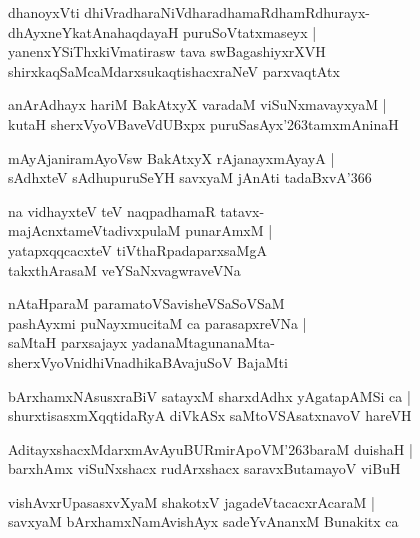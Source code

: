 \documentclass[twoside,12pt,openright]{book}
\def\S{\char'263}
\newcounter{shloka}[chapter]
\begin{document}
\begin{shloka}%
dhanoyxVti dhiVradharaNiVdharadhamaRdhamRdhurayx-\\
dhAyxneYkatAnahaqdayaH puruSoVtatxmaseyx |\\
yanenxYSiThxkiVmatirasw tava swBagashiyxrXVH \\
shirxkaqSaMcaMdarxsukaqtishacxraNeV parxvaqtAtx
\end{shloka}

\begin{shloka}%
anArAdhayx hariM BakAtxyX varadaM viSuNxmavayxyaM |\\
kutaH sherxVyoVBaveVdUBxpx puruSasAyx\S tamxmAninaH 
\end{shloka}

\begin{shloka}%
mAyAjaniramAyoVsw BakAtxyX rAjanayxmAyayA |\\
sAdhxteV  sAdhupuruSeYH savxyaM jAnAti tadaBxvA\char'366
\end{shloka}

\begin{shloka}%
na vidhayxteV teV naqpadhamaR tatavx-\\
majAcnxtameVtadivxpulaM punarAmxM |\\
yatapxqqcacxteV tiVthaRpadaparxsaMgA \\
takxthArasaM veYSaNxvagwraveVNa 
\end{shloka}

\begin{shloka}%
nAtaHparaM paramatoVSavisheVSaSoVSaM \\
pashAyxmi puNayxmucitaM ca parasapxreVNa |\\
saMtaH parxsajayx yadanaMtagunanaMta-\\
sherxVyoVnidhiVnadhikaBAvajuSoV BajaMti
\end{shloka}

\begin{shloka}%
bArxhamxNAsusxraBiV satayxM sharxdAdhx yAgatapAMSi ca |\\
shurxtisasxmXqqtidaRyA diVkASx saMtoVSAsatxnavoV hareVH 
\end{shloka}

\begin{shloka}%
AditayxshacxMdarxmAvAyuBURmirApoVM\S baraM duishaH |\\
barxhAmx viSuNxshacx rudArxshacx saravxButamayoV viBuH 
\end{shloka}

\begin{shloka}%
vishAvxrUpasasxvXyaM shakotxV jagadeVtacacxrAcaraM |\\
savxyaM bArxhamxNamAvishAyx sadeYvAnanxM Bunakitx ca 
\end{shloka}
\end{document}
